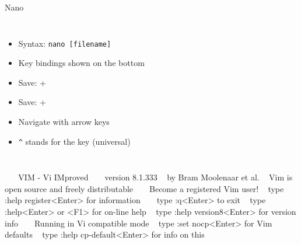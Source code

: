     \begin{frame}[t,fragile]{Nano}
        \begin{columns}[T]
            \begin{itemize}
                \item Syntax: \texttt{nano [filename]}
                \item Key bindings shown on the bottom
                \item Save: \keys{\ctrl} + 
                \item Save: \keys{\ctrl} + 
                \item Navigate with arrow keys \keys{\arrowkeyleft}
                    \keys{\arrowkeydown} \keys{\arrowkeyup}
                    \keys{\arrowkeyright}
                \item \texttt{\textasciicircum} stands for the \keys{\ctrl} key (universal)
            \end{itemize}
        \end{columns}
    \end{frame}

    \begin{frame}[t,fragile]{}
        \begin{bashenv}[\scriptsize]
~                                                                                       
~                                  VIM - Vi IMproved                                    
~                                                                                       
~                                   version 8.1.333                                     
~                               by Bram Moolenaar et al.                                
~                     Vim is open source and freely distributable                       
~                                                                                       
~                            Become a registered Vim user!                              
~                    type  :help register<Enter>   for information                      
~                                                                                       
~                    type  :q<Enter>               to exit                              
~                    type  :help<Enter>  or  <F1>  for on-line help                     
~                    type  :help version8<Enter>   for version info                     
~                                                                                       
~                            Running in Vi compatible mode                              
~                    type  :set nocp<Enter>        for Vim defaults                     
~                    type  :help cp-default<Enter> for info on this                     
~                                                                                       
~                                                                                       
        \end{bashenv}
    \end{frame}

